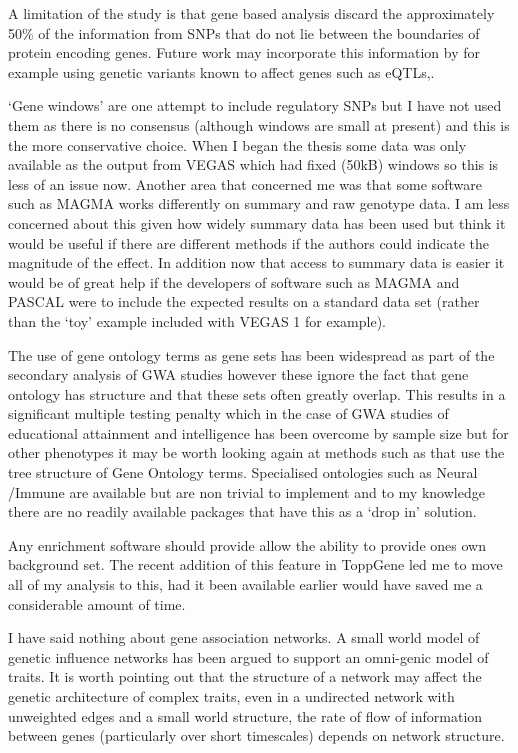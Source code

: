 A limitation of the study is that gene based analysis discard the approximately 50\% of the information from SNPs that do not lie between the boundaries of protein encoding genes. Future work may incorporate this information by for example using genetic variants known to affect genes such as eQTLs\cite{wang2020disease},\cite{gamazon2018using}.

`Gene windows' are one attempt to include regulatory SNPs but I have not used them as there is no consensus (although windows are small at present) and this is the more conservative choice. When I began the thesis some data was only available as the output from VEGAS which had fixed (50kB) windows so this is less of an issue now. Another area that concerned me was that some software such as MAGMA works differently on summary and raw genotype data. I am less concerned about this given how widely summary data has been used but think it would be useful if there are different methods if the authors could indicate the magnitude of the effect. In addition now that access to summary data is easier it would be of great help if the developers of software such as MAGMA and PASCAL were to include the expected results on a standard data set (rather than the `toy' example included with VEGAS 1 for example). 

The use of gene ontology terms as gene sets has been widespread as part of the secondary analysis of GWA studies however these ignore the fact that gene ontology has structure and that these sets often greatly overlap. This results in a significant multiple testing penalty which in the case of GWA studies of educational attainment and intelligence has been overcome by sample size but for other phenotypes it may be worth looking again at methods such as\cite{alexa2006improved} that use the tree structure of Gene Ontology terms. Specialised ontologies such as Neural /Immune\cite{geifman2010neural} are available but are non trivial to implement and to my knowledge there are no readily available packages that have this as a `drop in' solution.

Any enrichment software should provide allow the ability to provide ones own background set. The recent addition of this feature in ToppGene\cite{chen2009toppgene} led me to move all of my analysis to this, had it been available earlier would have saved me a considerable amount of time. 

I have said nothing about gene association networks. A small world model of genetic influence networks has been argued to support an omni-genic model of traits\cite{boyle2017expanded}. It is worth pointing out that the structure of a network may affect the genetic architecture of complex traits, even in a undirected network with unweighted edges and a small world structure, the rate of flow of information between genes (particularly over short timescales) depends on network structure.



